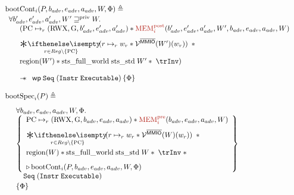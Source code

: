 \documentclass{article}
\newcommand{\X}[1]{\ensuremath{\mathrm{#1}}}
\newcommand{\I}[1]{\ensuremath{\mathtt{#1}}}
\newcommand{\br}[1]{{\color{BrickRed} #1}}
\newcommand{\bigast}[2]{\underset{#1}\Sep{\!\!\! #2}\;}
\begin{document}
\[
\begin{array}{l}
    \X{bootCont}_i(P,  b_{adv}, e_{adv}, a_{adv},W, \Phi) \eqdef  \\[0.2em]
    \begin{array}{l}
      \forall  b'_{adv}, e'_{adv}, a'_{adv},W' \Wpriv W \ldotp\\
       \quad\begin{array}{l}
       (\X{PC} \mapsto_{r} (\X{RWX}, \X{G}, b'_{adv}, e'_{adv}, a'_{adv}) \ast \br{\X{MEM}_i^{\X{post}}}(b'_{adv}, e'_{adv}, a'_{adv},W', b_{adv}, e_{adv}, a_{adv},W) \\[0.7em]
        \bigast{r \in Reg\setminus \{\X{PC}\}}{(r \mapsto_{r} w_r \ast \VR^{\notMMIO} (W')(w_r))} \ast {} \\[1.2em]
              \X{region}(W') \ast  \X{sts\_full\_world}\; \X{sts\_std} \; W'
      \ast \; \trInv  )
      \end{array}
    \end{array} \\[4em]
    \qquad\wand
    \begin{array}{l}
     \wpre{\I{Seq}\; (\I{Instr}\; \I{Executable})}{\Phi}
    \end{array}\\[1.2em]

  \X{bootSpec}_i(P) \eqdef \\[0.8em]
    \quad
  \begin{array}{l}
    \forall  b_{adv}, e_{adv}, a_{adv},W,\Phi \ldotp\\
    \left\{
    \begin{array}{l}
      \X{PC} \mapsto_{r} (\X{RWX}, \X{G}, b_{adv}, e_{adv}, a_{adv}) \ast \br{\X{MEM}_i^{\X{pre}}}(b_{adv}, e_{adv}, a_{adv},W) \\[0.7em]
      \bigast{r \in Reg\setminus \{\X{PC}\}}{(r \mapsto_{r} w_r \ast \VR^{\notMMIO} (W)(w_r))} \ast {} \\[1.2em]
      \X{region}(W) \ast  \X{sts\_full\_world}\; \X{sts\_std} \; W
      \ast \; \trInv \; \ast \\[.8em]
      \later \X{bootCont}_i(P,  b_{adv}, e_{adv}, a_{adv},W, \Phi)
    \end{array}
    \right\}
    \\[2.5em]
    \quad \I{Seq}\; (\I{Instr}\; \I{Executable})
    \\[0.2em]
    \left\{ \Phi \right\}
  \end{array}\\[4em]

\end{array}
\]
\end{document}
